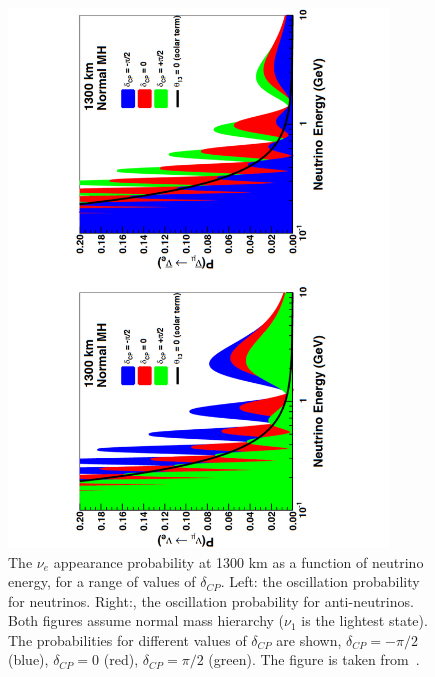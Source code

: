 \begin{figure}
  \centering 
  \includegraphics[width=0.9\textwidth]{DUNEOscillProb}
  \caption[The $\nu_e$ appearance probability at 1300 km as a function of neutrino energy, for a range of values of $\delta_{CP}$]
          {The $\nu_e$ appearance probability at 1300 km as a function of neutrino energy, for a range of values of $\delta_{CP}$. Left: the oscillation probability for neutrinos. Right:, the oscillation probability for anti-neutrinos. Both figures assume normal mass hierarchy ($\nu_1$ is the lightest state). The probabilities for different values of $\delta_{CP}$ are shown, $\delta_{CP} = -\pi/2$ (blue), $\delta_{CP} = 0$ (red), $\delta_{CP} = \pi/2$ (green). The figure is taken from~\citep{DUNECDR_V2}.}
  \label{fig:DUNEOscillProb}
\end{figure}

